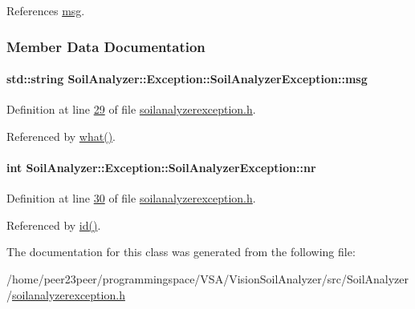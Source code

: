References \hyperlink{soilanalyzerexception_8h_source_l00029}{msg}.



\subsubsection{Member Data Documentation}
\hypertarget{class_soil_analyzer_1_1_exception_1_1_soil_analyzer_exception_a5376a12e65d4efd59f335f1b9ac61282}{}
\paragraph[{msg}]{\setlength{\rightskip}{0pt plus 5cm}std\+::string Soil\+Analyzer\+::\+Exception\+::\+Soil\+Analyzer\+Exception\+::msg\hspace{0.3cm}{\ttfamily [private]}}\label{class_soil_analyzer_1_1_exception_1_1_soil_analyzer_exception_a5376a12e65d4efd59f335f1b9ac61282}


Definition at line \hyperlink{soilanalyzerexception_8h_source_l00029}{29} of file \hyperlink{soilanalyzerexception_8h_source}{soilanalyzerexception.\+h}.



Referenced by \hyperlink{soilanalyzerexception_8h_source_l00025}{what()}.

\hypertarget{class_soil_analyzer_1_1_exception_1_1_soil_analyzer_exception_a065117847788860589e421895dc6d2c3}{}
\paragraph[{nr}]{\setlength{\rightskip}{0pt plus 5cm}int Soil\+Analyzer\+::\+Exception\+::\+Soil\+Analyzer\+Exception\+::nr\hspace{0.3cm}{\ttfamily [private]}}\label{class_soil_analyzer_1_1_exception_1_1_soil_analyzer_exception_a065117847788860589e421895dc6d2c3}


Definition at line \hyperlink{soilanalyzerexception_8h_source_l00030}{30} of file \hyperlink{soilanalyzerexception_8h_source}{soilanalyzerexception.\+h}.



Referenced by \hyperlink{soilanalyzerexception_8h_source_l00026}{id()}.



The documentation for this class was generated from the following file\+:\begin{DoxyCompactItemize}
\item 
/home/peer23peer/programmingspace/\+V\+S\+A/\+Vision\+Soil\+Analyzer/src/\+Soil\+Analyzer/\hyperlink{soilanalyzerexception_8h}{soilanalyzerexception.\+h}\end{DoxyCompactItemize}

